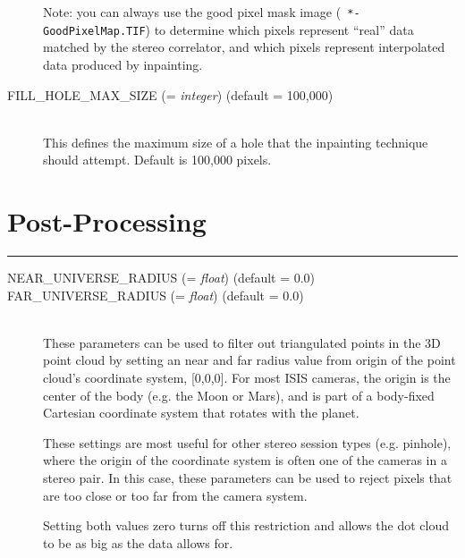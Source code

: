 \begin{description}
  Note: you can always use the good pixel mask image ({\tt
    *-GoodPixelMap.TIF}) to determine which pixels represent ``real''
  data matched by the stereo correlator, and which pixels represent
  interpolated data produced by inpainting.

\item[FILL\_HOLE\_MAX\_SIZE \textnormal{\small{(= \emph{integer})}} (default = 100,000)] \hfill \\
  This defines the maximum size of a hole that the inpainting
  technique should attempt. Default is 100,000 pixels.

\end{description}


\section{Post-Processing}
\hrule
\bigskip

\begin{description}
\item[NEAR\_UNIVERSE\_RADIUS \textnormal{\small{(= \emph{float})}} (default = 0.0)]
\item[FAR\_UNIVERSE\_RADIUS \textnormal{\small{(= \emph{float})}} (default = 0.0)] \hfill \\
  These parameters can be used to filter out triangulated points in
  the 3D point cloud by setting an near and far radius value from
  origin of the point cloud's coordinate system, [0,0,0].  For most
  ISIS cameras, the origin is the center of the body (e.g. the Moon or
  Mars), and is part of a body-fixed Cartesian coordinate system that
  rotates with the planet.

  These settings are most useful for other stereo session types
  (e.g. pinhole), where the origin of the coordinate system is often
  one of the cameras in a stereo pair.  In this case, these parameters
  can be used to reject pixels that are too close or too far from the
  camera system.

  Setting both values zero turns off this restriction and allows the
  dot cloud to be as big as the data allows for.

\end{description}



